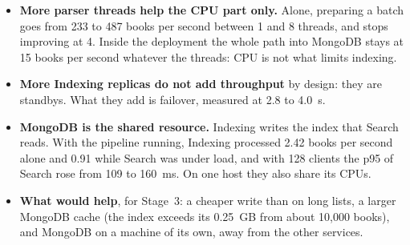 \begin{itemize}
  \item \textbf{More parser threads help the CPU part only.} Alone, preparing a batch goes from 233 to 487 books per
        second between 1 and 8 threads, and stops improving at 4. Inside the deployment the whole path into MongoDB
        stays at 15 books per second whatever the threads: CPU is not what limits indexing.
  \item \textbf{More Indexing replicas do not add throughput} by design: they are standbys. What they add is
        failover, measured at 2.8 to 4.0~s.
  \item \textbf{MongoDB is the shared resource.} Indexing writes the index that Search reads. With the pipeline
        running, Indexing processed 2.42 books per second alone and 0.91 while Search was under load, and with 128
        clients the p95 of Search rose from 109 to 160~ms. On one host they also share its CPUs.
  \item \textbf{What would help}, for Stage~3: a cheaper write than  on long lists, a larger MongoDB
        cache (the index exceeds its 0.25~GB from about 10,000 books), and MongoDB on a machine of its own, away from
        the other services.
\end{itemize}
